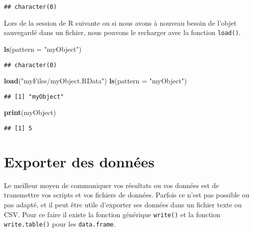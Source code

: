 \documentclass[]{book}
\newenvironment{Shaded}{\begin{snugshade}}{\end{snugshade}}
\newcommand{\KeywordTok}[1]{\textcolor[rgb]{0.13,0.29,0.53}{\textbf{#1}}}
\newcommand{\DataTypeTok}[1]{\textcolor[rgb]{0.13,0.29,0.53}{#1}}
\newcommand{\StringTok}[1]{\textcolor[rgb]{0.31,0.60,0.02}{#1}}
\newcommand{\NormalTok}[1]{#1}
\theoremstyle{definition}
\theoremstyle{definition}
\theoremstyle{definition}
\theoremstyle{remark}
\begin{document}
\begin{verbatim}
## character(0)
\end{verbatim}

Lors de la session de R suivante ou si nous avons à nouveau besoin de
l'objet sauvegardé dans un fichier, nous pouvons le recharger avec la
fonction \texttt{load()}.

\begin{Shaded}
\begin{Highlighting}[]
\KeywordTok{ls}\NormalTok{(}\DataTypeTok{pattern =} \StringTok{"myObject"}\NormalTok{)}
\end{Highlighting}
\end{Shaded}

\begin{verbatim}
## character(0)
\end{verbatim}

\begin{Shaded}
\begin{Highlighting}[]
\KeywordTok{load}\NormalTok{(}\StringTok{"myFiles/myObject.RData"}\NormalTok{)}
\KeywordTok{ls}\NormalTok{(}\DataTypeTok{pattern =} \StringTok{"myObject"}\NormalTok{)}
\end{Highlighting}
\end{Shaded}

\begin{verbatim}
## [1] "myObject"
\end{verbatim}

\begin{Shaded}
\begin{Highlighting}[]
\KeywordTok{print}\NormalTok{(myObject)}
\end{Highlighting}
\end{Shaded}

\begin{verbatim}
## [1] 5
\end{verbatim}

\section{Exporter des données}\label{l016write}

Le meilleur moyen de communiquer vos résultats ou vos données est de
transmettre vos scripts et vos fichiers de données. Parfois ce n'est pas
possible ou pas adapté, et il peut être utile d'exporter ses données
dans un fichier texte ou CSV. Pour ce faire il existe la fonction
générique \texttt{write()} et la fonction \texttt{write.table()} pour
les \texttt{data.frame}.
\end{document}
